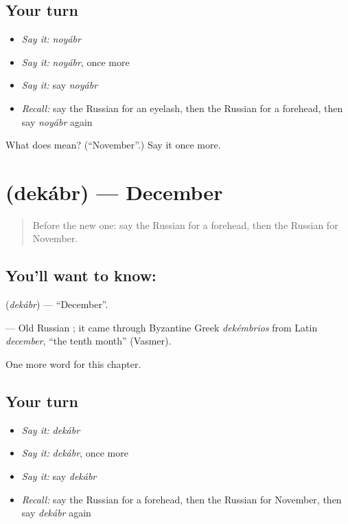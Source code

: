 \subsection*{Your turn}
\begin{itemize}
\raggedright
  \item \emph{Say it:} \emph{noyábr}
  \item \emph{Say it:} \emph{noyábr}, once more
  \item \emph{Say it:} say \emph{noyábr}
  \item \emph{Recall:} say the Russian for an eyelash, then the Russian for a forehead, then say \emph{noyábr} again
\end{itemize}

\begin{tcolorbox}[breakable,colback=teal!4,colframe=teal!35!black,title={Before you move on}]
What does  mean? (\textquotedblleft{}November\textquotedblright{}.) Say it once more.
\end{tcolorbox}
\section[\texorpdfstring{\ru{декабрь} (dekábr)}{декабрь (dekábr)}]{ (dekábr) — December}

\label{lesson:RU-C240-dekabr}



\begin{quote}
Before the new one: say the Russian for a forehead, then the Russian for November.
\end{quote}

\subsection*{You'll want to know: }
\textbf{} (\emph{dekábr}) — \textquotedblleft{}December\textquotedblright{}.

\begin{cousinweb}
\textbf{} — Old Russian \emph{}; it came through Byzantine Greek \emph{dekémbrios} from Latin \emph{december}, \textquotedblleft{}the tenth month\textquotedblright{} (Vasmer).
\end{cousinweb}

\begin{grammarlens}[title={What you've built}]
One more word for this chapter.
\end{grammarlens}

\subsection*{Your turn}
\begin{itemize}
\raggedright
  \item \emph{Say it:} \emph{dekábr}
  \item \emph{Say it:} \emph{dekábr}, once more
  \item \emph{Say it:} say \emph{dekábr}
  \item \emph{Recall:} say the Russian for a forehead, then the Russian for November, then say \emph{dekábr} again
\end{itemize}

